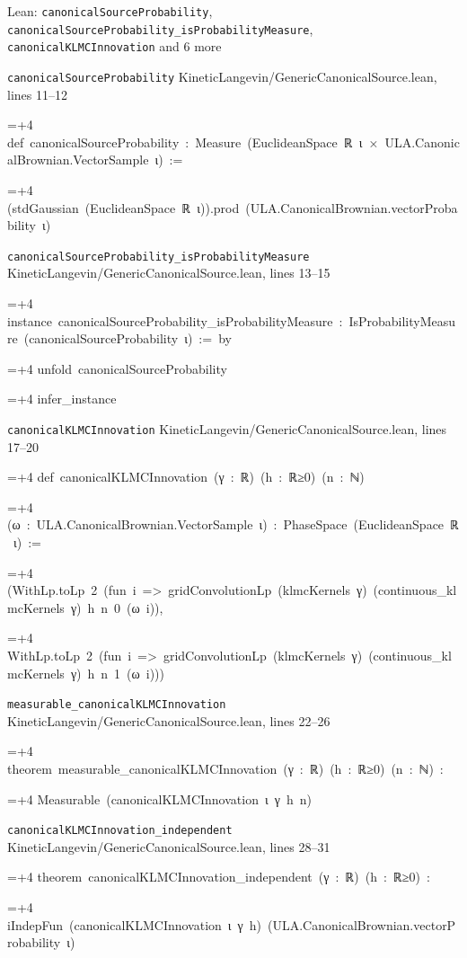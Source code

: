 \documentclass[11pt,a4paper]{article}
\newlength{\leancharwidth}
\newenvironment{leancode}{\par\smallskip\begingroup\ttfamily\footnotesize\raggedright
  \settowidth{\leancharwidth}{M}\setlength{\parskip}{0pt}\setlength{\parindent}{0pt}
  \frenchspacing}{\par\endgroup\smallskip}
\newcommand{\leanline}[2]{\hangindent=\dimexpr#1\leancharwidth+4\leancharwidth\relax
  \hangafter=1\noindent\hspace*{#1\leancharwidth}#2\par}
\newcommand{\leansource}[1]{\par{\footnotesize\color{leanmuted}#1}\par}
\begin{document}
\begin{leanbox}{Lean: \texttt{canonicalSourceProbability}, \texttt{canonicalSourceProbability\_\allowbreak{}isProbabilityMeasure}, \texttt{canonicalKLMCInnovation} and 6 more}
\leansource{\texttt{canonicalSourceProbability} \quad KineticLangevin/\allowbreak{}GenericCanonicalSource.lean, lines 11–12}
\begin{leancode}
\leanline{0}{def\ canonicalSourceProbability\ :\ Measure\ (EuclideanSpace\ ℝ\ ι\ ×\ ULA.CanonicalBrownian.VectorSample\ ι)\ :=}
\leanline{2}{(stdGaussian\ (EuclideanSpace\ ℝ\ ι)).prod\ (ULA.CanonicalBrownian.vectorProbability\ ι)}
\end{leancode}
\leansource{\texttt{canonicalSourceProbability\_\allowbreak{}isProbabilityMeasure} \quad KineticLangevin/\allowbreak{}GenericCanonicalSource.lean, lines 13–15}
\begin{leancode}
\leanline{0}{instance\ canonicalSourceProbability\_isProbabilityMeasure\ :\ IsProbabilityMeasure\ (canonicalSourceProbability\ ι)\ :=\ by}
\leanline{2}{unfold\ canonicalSourceProbability}
\leanline{2}{infer\_instance}
\end{leancode}
\leansource{\texttt{canonicalKLMCInnovation} \quad KineticLangevin/\allowbreak{}GenericCanonicalSource.lean, lines 17–20}
\begin{leancode}
\leanline{0}{def\ canonicalKLMCInnovation\ (γ\ :\ ℝ)\ (h\ :\ ℝ≥0)\ (n\ :\ ℕ)}
\leanline{4}{(ω\ :\ ULA.CanonicalBrownian.VectorSample\ ι)\ :\ PhaseSpace\ (EuclideanSpace\ ℝ\ ι)\ :=}
\leanline{2}{(WithLp.toLp\ 2\ (fun\ i\ =>\ gridConvolutionLp\ (klmcKernels\ γ)\ (continuous\_klmcKernels\ γ)\ h\ n\ 0\ (ω\ i)),}
\leanline{3}{WithLp.toLp\ 2\ (fun\ i\ =>\ gridConvolutionLp\ (klmcKernels\ γ)\ (continuous\_klmcKernels\ γ)\ h\ n\ 1\ (ω\ i)))}
\end{leancode}
\leansource{\texttt{measurable\_\allowbreak{}canonicalKLMCInnovation} \quad KineticLangevin/\allowbreak{}GenericCanonicalSource.lean, lines 22–26}
\begin{leancode}
\leanline{0}{theorem\ measurable\_canonicalKLMCInnovation\ (γ\ :\ ℝ)\ (h\ :\ ℝ≥0)\ (n\ :\ ℕ)\ :}
\leanline{4}{Measurable\ (canonicalKLMCInnovation\ ι\ γ\ h\ n)}
\end{leancode}
\leansource{\texttt{canonicalKLMCInnovation\_\allowbreak{}independent} \quad KineticLangevin/\allowbreak{}GenericCanonicalSource.lean, lines 28–31}
\begin{leancode}
\leanline{0}{theorem\ canonicalKLMCInnovation\_independent\ (γ\ :\ ℝ)\ (h\ :\ ℝ≥0)\ :}
\leanline{4}{iIndepFun\ (canonicalKLMCInnovation\ ι\ γ\ h)\ (ULA.CanonicalBrownian.vectorProbability\ ι)}

\end{leancode}
\end{leanbox}
\end{document}
